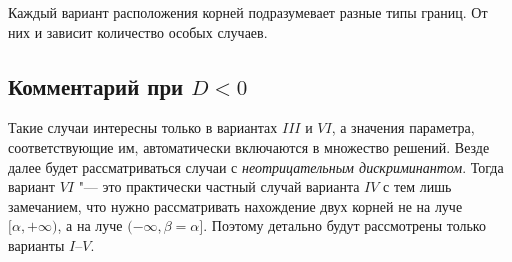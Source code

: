 Каждый вариант расположения корней подразумевает разные типы границ. От них и зависит количество
особых случаев.

\subsection {Комментарий при $D < 0$}

Такие случаи интересны только в вариантах $III$ и $VI$, а значения параметра, соответствующие им,
автоматически включаются в множество решений. Везде далее будет рассматриваться случаи с
\emph{неотрицательным дискриминантом}. Тогда вариант $VI$ "--- это практически частный случай
варианта $IV$ с тем лишь замечанием, что нужно рассматривать нахождение двух корней не на луче
$[\alpha, +\infty)$, а на луче $(-\infty, \beta=\alpha]$. Поэтому детально будут рассмотрены только
варианты $I$--$V$. 


